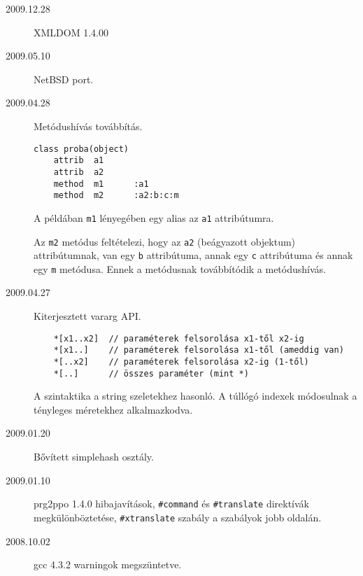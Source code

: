 
\begin{description}

\item[2009.12.28]
  XMLDOM  1.4.00\par

\item[2009.05.10]
  NetBSD port.\par

\item[2009.04.28]
  Metódushívás továbbítás.\par

\begin{verbatim}
class proba(object)
    attrib  a1
    attrib  a2
    method  m1      :a1
    method  m2      :a2:b:c:m
\end{verbatim}

A példában \verb!m1! lényegében egy alias az \verb!a1! attribútumra.

Az \verb!m2! metódus feltételezi, hogy az \verb!a2! (beágyazott objektum) 
attribútumnak, van egy \verb!b! attribútuma, annak egy \verb!c! attribútuma 
és annak egy \verb!m! metódusa. Ennek a metódusnak továbbítódik a metódushívás.


\item[2009.04.27]
  Kiterjesztett vararg API.\par

\begin{verbatim}
    *[x1..x2]  // paraméterek felsorolása x1-től x2-ig
    *[x1..]    // paraméterek felsorolása x1-től (ameddig van)
    *[..x2]    // paraméterek felsorolása x2-ig (1-től)
    *[..]      // összes paraméter (mint *)
\end{verbatim}
A szintaktika a string szeletekhez hasonló. 
A túllógó indexek módosulnak a tényleges méretekhez alkalmazkodva.



\item[2009.01.20]
  Bővített simplehash osztály.\par

\item[2009.01.10]
  prg2ppo 1.4.0 
    hibajavítások,
    \verb!#command! és \verb!#translate! direktívák megkülönböztetése,
    \verb!#xtranslate! szabály a szabályok jobb oldalán.\par

\item[2008.10.02]
  gcc 4.3.2 warningok megszüntetve.\par


\end{description}
